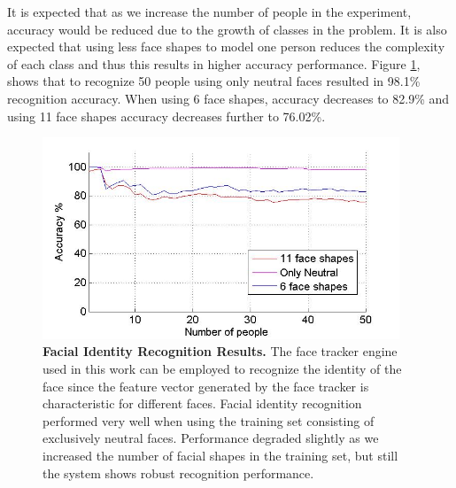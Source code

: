 \documentclass[]{article}
\begin{document}
It is expected that as we increase the number of people in the experiment, accuracy would be reduced due to the growth
of classes in the problem. It is also expected  that using less face shapes to model one person reduces the complexity of
each class and thus this results in higher accuracy performance. Figure \ref{identityRecognition}, shows that to recognize 50
people using only neutral faces resulted in 98.1\% recognition accuracy.  When using 6 face shapes, accuracy decreases
to 82.9\% and using 11 face shapes accuracy decreases further to 76.02\%.


\begin{figure}[ht]
\begin{center}
\vspace{-3mm}
\includegraphics[width=0.95\textwidth]{figures/peopleRecognition4.jpg}
\end{center}
\caption{\textbf{Facial Identity Recognition Results.} The face tracker engine used in this work can be employed 
to recognize the identity of the face since the feature vector generated by the face tracker is characteristic for
different faces. Facial identity recognition performed very well when using the training set consisting of exclusively neutral faces. 
Performance degraded slightly as we increased the number of facial shapes in the training set, but still the system shows 
robust  recognition performance.}
\label{identityRecognition}
\end{figure}
\end{document}
